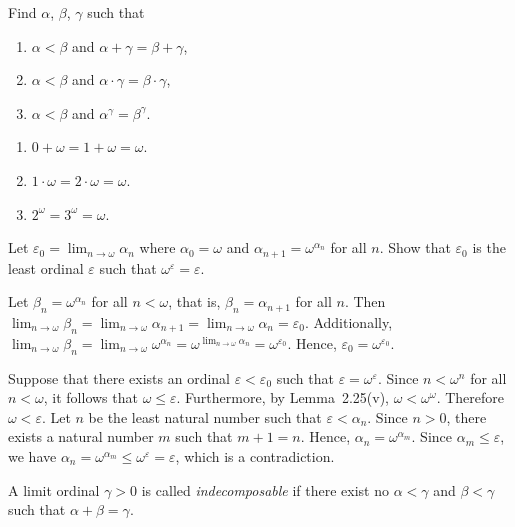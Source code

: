 Find $\alpha$, $\beta$, $\gamma$ such that
\begin{enumerate}[label=(\roman*)]
\item 
$\alpha < \beta$ and $\alpha + \gamma = \beta + \gamma$,
\item 
$\alpha < \beta$ and $\alpha \cdot \gamma = \beta \cdot \gamma$,
\item 
$\alpha < \beta$ and $\alpha^{\gamma} = \beta^{\gamma}$.
\end{enumerate}
\begin{solution}
\begin{enumerate}[label=(\roman*)]
\item
$0 + \omega = 1 + \omega = \omega$.
\item
$1 \cdot \omega = 2 \cdot \omega = \omega$.
\item
$2^\omega = 3^\omega = \omega$.
\end{enumerate}
\end{solution}

 Let $\varepsilon_0 = \lim_{n \rightarrow \omega} \alpha_n$ where 
$\alpha_0 = \omega$ and $\alpha_{n + 1} = \omega^{\alpha_n}$ for all $n$. Show 
that $\varepsilon_0$ is the least ordinal $\varepsilon$ such that 
$\omega^\varepsilon = \varepsilon$.
\begin{solution}
Let $\beta_n = \omega^{\alpha_n}$ for all $n < \omega$, that is, 
$\beta_n = \alpha_{n + 1}$ for all $n$. Then 
$\lim_{n \rightarrow \omega} \beta_n = \lim_{n \rightarrow \omega} 
\alpha_{n + 1} = \lim_{n \rightarrow \omega} \alpha_n = \varepsilon_0$. 
Additionally, $\lim_{n \rightarrow \omega} \beta_n = \lim_{n \rightarrow 
\omega} \omega^{\alpha_n} = \omega^{\lim_{n \rightarrow \omega} \alpha_n} = 
\omega^{\varepsilon_0}$. Hence, $\varepsilon_0 = \omega^{\varepsilon_0}$.

Suppose that there exists an ordinal $\varepsilon < \varepsilon_0$ such that 
$\varepsilon = \omega^\varepsilon$. Since $n < \omega^n$ for all $n < \omega$, 
it follows that $\omega \leq \varepsilon$. Furthermore, by Lemma~2.25(v), 
$\omega < \omega^\omega$. Therefore $\omega < \varepsilon$. Let $n$ be the 
least natural number such that $\varepsilon < \alpha_n$. Since $n > 0$, there 
exists a natural number $m$ such that $m + 1 = n$. Hence, 
$\alpha_n = \omega^{\alpha_m}$. Since $\alpha_m \leq \varepsilon$, we have 
$\alpha_n = \omega^{\alpha_m} \leq \omega^\varepsilon = \varepsilon$, 
which is a contradiction.
\end{solution}

A limit ordinal $\gamma > 0$ is called \emph{indecomposable} if there exist no 
$\alpha < \gamma$ and $\beta < \gamma$ such that $\alpha + \beta = \gamma$.

